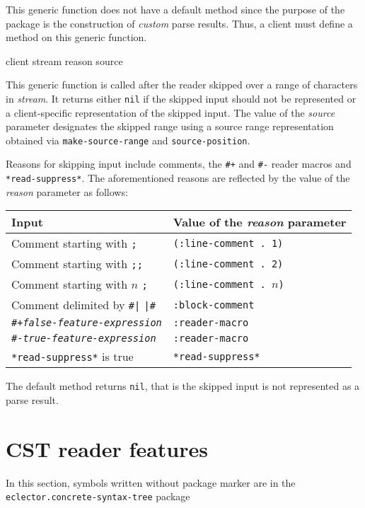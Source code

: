 This generic function does not have a default method since the purpose
of the package is the construction of \emph{custom} parse results.
Thus, a client must define a method on this generic function.

 {client stream reason source}

This generic function is called after the reader skipped over a range
of characters in \textit{stream}.  It returns either \texttt{nil} if
the skipped input should not be represented or a client-specific
representation of the skipped input.  The value of the \textit{source}
parameter designates the skipped range using a source range
representation obtained via \texttt{make-source-range} and
\texttt{source-position}.

Reasons for skipping input include comments, the \texttt{\#+} and
\texttt{\#-} reader macros and \texttt{*read-suppress*}.  The
aforementioned reasons are reflected by the value of the
\textit{reason} parameter as follows:

\begin{tabular}{ll}
  Input                                          & Value of the \textit{reason} parameter\\
  \hline
  Comment starting with \texttt{;}               & \texttt{(:line-comment . 1)}\\
  Comment starting with \texttt{;;}              & \texttt{(:line-comment . 2)}\\
  Comment starting with $n$ \texttt{;}           & \texttt{(:line-comment . $n$)}\\
  Comment delimited by \texttt{\#|} \texttt{|\#} & \texttt{:block-comment}\\
  \texttt{\#+\textit{false-feature-expression}}  & \texttt{:reader-macro}\\
  \texttt{\#-\textit{true-feature-expression}}   & \texttt{:reader-macro}\\
  \texttt{*read-suppress*} is true               & \texttt{*read-suppress*}
\end{tabular}

The default method returns \texttt{nil}, that is the skipped input is
not represented as a parse result.

\section{CST reader features}
\label{sec:cst-reader-features}

In this section, symbols written without package marker are in the
\texttt{eclector.concrete-syntax-tree} package

